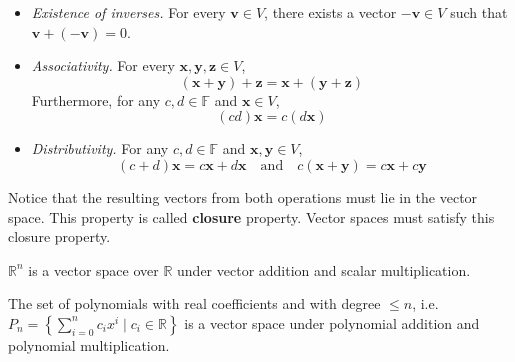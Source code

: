 \documentclass[12pt]{article}
\begin{document}
\begin{definition}
\begin{itemize}
\item \textit{Existence of inverses.} For every $\mathbf{v}\in V$, there exists a vector $-\mathbf{v}\in V$ such that $\mathbf{v} + (-\mathbf{v}) = 0$. 
\item \textit{Associativity.} For every $\mathbf{x},\mathbf{y},\mathbf{z}\in V$, $$(\mathbf{x} + \mathbf{y}) + \mathbf{z} = \mathbf{x} + (\mathbf{y} + \mathbf{z})$$ Furthermore, for any $c,d\in\mathbb{F}$ and $\mathbf{x}\in V$, $$(cd)\mathbf{x} = c(d\mathbf{x})$$
\item \textit{Distributivity.} For any $c,d\in\mathbb{F}$ and $\mathbf{x},\mathbf{y}\in V$, $$(c + d)\mathbf{x} = c\mathbf{x} + d\mathbf{x}\quad\text{and}\quad c(\mathbf{x} + \mathbf{y}) = c\mathbf{x} + c\mathbf{y}$$

\end{itemize}
\end{definition}
\noindent Notice that the resulting vectors from both operations must lie in the vector space. This property is called \textbf{closure} property. Vector spaces must satisfy this closure property. 
\begin{example} $\mathbb{R}^n$ is a vector space over $\mathbb{R}$ under vector addition and scalar multiplication.\end{example}
\begin{example} The set of polynomials with real coefficients and with degree $\leqslant n$, i.e. $P_n = \left\{\sum_{i=0}^n c_ix^i \mid c_i\in\mathbb{R}\right\}$ is a vector space under polynomial addition and polynomial multiplication.\end{example}
\end{document}
